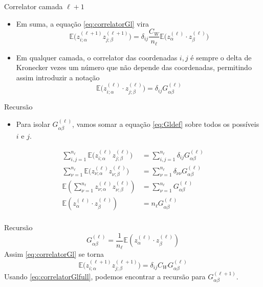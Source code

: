 \documentclass{beamer}
\newcommand{\EE}{\mathbb{E}}
\newcommand{\aaA}{\alpha}
\newcommand{\aaB}{\beta}
\begin{document}
\begin{frame}{Correlator camada $\ell +1$}
	\begin{itemize}
		\item Em suma, a equação \eqref{eq:correlatorGl} vira 
		 \begin{equation*}
			\EE\big(z^{(\ell +1)}_{i;\aaA} z^{(\ell +1)}_{j;\aaB}\big) = \delta_{ij}\frac{C_W}{n_\ell} \EE\big(z^{(\ell)}_{\aaA}\cdot  z^{(\ell)}_{\aaB}\big)\tag{3.11}
		 \end{equation*}
		 \item Em qualquer camada, o correlator das coordenadas $i,j$ é sempre o delta de Kronecker vezes um número que não depende das coordenadas, permitindo assim introduzir a notação 
		 \begin{equation*}\tag{3.12}\label{eq:Gldef}
			\EE\big(z^{(\ell)}_{i;\aaA}\cdot z^{(\ell)}_{j;\aaB}\big) = \delta_{ij} G^{(\ell)}_{\aaA\aaB}  
		 \end{equation*}
	\end{itemize}
\end{frame}

\begin{frame}{Recursão}
	\begin{itemize}
		\item Para isolar $G^{(\ell)}_{\aaA\aaB}$, vamos somar a equação \eqref{eq:Gldef} sobre todos os possíveis $i$ e $j$.
	\end{itemize}
	\begin{align*}
		\sum_{i,j=1}^{n_\ell} \EE\big(z^{(\ell)}_{i;\aaA} z^{(\ell)}_{j;\aaB}\big) &= \sum_{i,j=1}^{n_\ell} \delta_{ij} G^{(\ell)}_{\aaA\aaB} \\
		\sum_{\nu=1}^{n_\ell} \EE\big(z^{(\ell)}_{\nu;\aaA} z^{(\ell)}_{\nu;\aaB}\big) &= \sum_{\nu=1}^{n_\ell} \delta_{\nu\nu}G^{(\ell)}_{\aaA\aaB} \\
		\EE\left(\sum_{\nu=1}^{n_\ell}z^{(\ell)}_{\nu;\aaA} z^{(\ell)}_{\nu;\aaB}\right) &= \sum_{\nu=1}^{n_\ell} G^{(\ell)}_{\aaA\aaB} \\
		\EE(z^{(\ell)}_{\aaA}\cdot z^{(\ell)}_{\aaB}) &= n_\ell G^{(\ell)}_{\aaA\aaB} \\
	\end{align*}
\end{frame}

\begin{frame}{Recursão}
	\begin{equation*}\tag{3.13}\label{eq:Gl}
		G^{(\ell)}_{\aaA\aaB} = \frac{1}{n_\ell}\EE(z^{(\ell)}_{\aaA}\cdot z^{(\ell)}_{\aaB})		
	\end{equation*}
	Assim \eqref{eq:correlatorGl} se torna
	\begin{equation*}\tag{3.11'}\label{eq:correlatorGlfull}
		\EE\big(z^{(\ell +1)}_{i;\aaA} z^{(\ell +1)}_{j;\aaB}\big) = \delta_{ij}C_WG^{(\ell)}_{\aaA\aaB}
	\end{equation*}
	Usando \eqref{eq:correlatorGlfull}, podemos encontrar a recursão para $G^{(\ell+1)}_{\aaA\aaB}$.
\end{frame}
\end{document}
